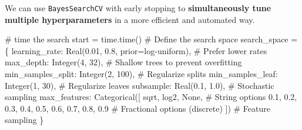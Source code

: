 \documentclass[
  letterpaper,
  DIV=11,
  numbers=noendperiod]{scrreprt}
\newenvironment{Shaded}{\begin{snugshade}}{\end{snugshade}}
\newcommand{\CommentTok}[1]{\textcolor[rgb]{0.37,0.37,0.37}{#1}}
\newcommand{\DecValTok}[1]{\textcolor[rgb]{0.68,0.00,0.00}{#1}}
\newcommand{\FloatTok}[1]{\textcolor[rgb]{0.68,0.00,0.00}{#1}}
\newcommand{\NormalTok}[1]{\textcolor[rgb]{0.00,0.23,0.31}{#1}}
\newcommand{\OperatorTok}[1]{\textcolor[rgb]{0.37,0.37,0.37}{#1}}
\newcommand{\StringTok}[1]{\textcolor[rgb]{0.13,0.47,0.30}{#1}}
\newcommand{\VariableTok}[1]{\textcolor[rgb]{0.07,0.07,0.07}{#1}}
\begin{document}
We can use \texttt{BayesSearchCV} with early stopping to
\textbf{simultaneously tune multiple hyperparameters} in a more
efficient and automated way.

\begin{Shaded}
\begin{Highlighting}[]
\CommentTok{\# time the search}
\NormalTok{start }\OperatorTok{=}\NormalTok{ time.time()}
\CommentTok{\# Define the search space}
\NormalTok{search\_space }\OperatorTok{=}\NormalTok{ \{}
    \StringTok{\textquotesingle{}learning\_rate\textquotesingle{}}\NormalTok{: Real(}\FloatTok{0.01}\NormalTok{, }\FloatTok{0.8}\NormalTok{, prior}\OperatorTok{=}\StringTok{\textquotesingle{}log{-}uniform\textquotesingle{}}\NormalTok{),  }\CommentTok{\# Prefer lower rates}
    \StringTok{\textquotesingle{}max\_depth\textquotesingle{}}\NormalTok{: Integer(}\DecValTok{4}\NormalTok{, }\DecValTok{32}\NormalTok{),          }\CommentTok{\# Shallow trees to prevent overfitting}
    \StringTok{\textquotesingle{}min\_samples\_split\textquotesingle{}}\NormalTok{: Integer(}\DecValTok{2}\NormalTok{, }\DecValTok{100}\NormalTok{), }\CommentTok{\# Regularize splits}
    \StringTok{\textquotesingle{}min\_samples\_leaf\textquotesingle{}}\NormalTok{: Integer(}\DecValTok{1}\NormalTok{, }\DecValTok{30}\NormalTok{),  }\CommentTok{\# Regularize leaves}
    \StringTok{\textquotesingle{}subsample\textquotesingle{}}\NormalTok{: Real(}\FloatTok{0.1}\NormalTok{, }\FloatTok{1.0}\NormalTok{),         }\CommentTok{\# Stochastic sampling}
    \StringTok{\textquotesingle{}max\_features\textquotesingle{}}\NormalTok{: Categorical([}
        \StringTok{\textquotesingle{}sqrt\textquotesingle{}}\NormalTok{, }\StringTok{\textquotesingle{}log2\textquotesingle{}}\NormalTok{, }\VariableTok{None}\NormalTok{,  }\CommentTok{\# String options}
        \FloatTok{0.1}\NormalTok{, }\FloatTok{0.2}\NormalTok{, }\FloatTok{0.3}\NormalTok{, }\FloatTok{0.4}\NormalTok{, }\FloatTok{0.5}\NormalTok{, }\FloatTok{0.6}\NormalTok{, }\FloatTok{0.7}\NormalTok{, }\FloatTok{0.8}\NormalTok{, }\FloatTok{0.9}  \CommentTok{\# Fractional options (discrete)}
\NormalTok{    ])  }\CommentTok{\# Feature sampling}
\NormalTok{\}}


\end{Highlighting}
\end{Shaded}
\end{document}
